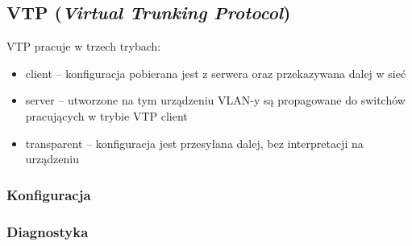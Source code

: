 \subsection{VTP (\textit{Virtual Trunking Protocol})}
VTP pracuje w trzech trybach:
\begin{itemize}
	\item client -- konfiguracja pobierana jest z serwera oraz przekazywana dalej w sieć
    \item server -- utworzone na tym urządzeniu VLAN-y są propagowane do switchów pracujących w trybie VTP client
    \item transparent -- konfiguracja jest przesyłana dalej, bez interpretacji na urządzeniu
\end{itemize}

\subsubsection{Konfiguracja}

\subsubsection{Diagnostyka}
